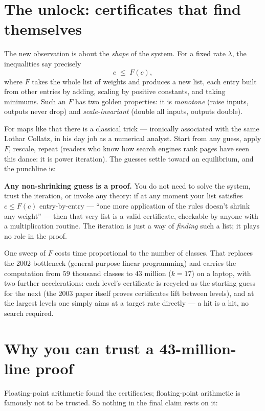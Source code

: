 \documentclass[11pt]{article}
\begin{document}
\section{The unlock: certificates that find themselves}

The new observation is about the \emph{shape} of the system. For a
fixed rate $\lambda$, the inequalities say precisely
\[
c \;\le\; F(c),
\]
where $F$ takes the whole list of weights and produces a new list, each
entry built from other entries by adding, scaling by positive
constants, and taking minimums. Such an $F$ has two golden properties:
it is \emph{monotone} (raise inputs, outputs never drop) and
\emph{scale-invariant} (double all inputs, outputs double).

For maps like that there is a classical trick --- ironically associated
with the same Lothar Collatz, in his day job as a numerical analyst.
Start from any guess, apply $F$, rescale, repeat (readers who know how
search engines rank pages have seen this dance: it is power iteration).
The guesses settle toward an equilibrium, and the punchline is:

\begin{keyidea}
\textbf{Any non-shrinking guess is a proof.} You do not need to solve
the system, trust the iteration, or invoke any theory: if at any moment
your list satisfies $c \le F(c)$ entry-by-entry --- ``one more
application of the rules doesn't shrink any weight'' --- then that very
list is a valid certificate, checkable by anyone with a multiplication
routine. The iteration is just a way of \emph{finding} such a list; it
plays no role in the proof.
\end{keyidea}

One sweep of $F$ costs time proportional to the number of classes. That
replaces the 2002 bottleneck (general-purpose linear programming) and
carries the computation from $59$ thousand classes to $43$ million
($k = 17$) on a laptop, with two further accelerations: each level's
certificate is recycled as the starting guess for the next (the 2003
paper itself proves certificates lift between levels), and at the
largest levels one simply aims at a target rate directly --- a hit is a
hit, no search required.

\section{Why you can trust a 43-million-line proof}

Floating-point arithmetic found the certificates; floating-point
arithmetic is famously not to be trusted. So nothing in the final claim
rests on it:
\end{document}
